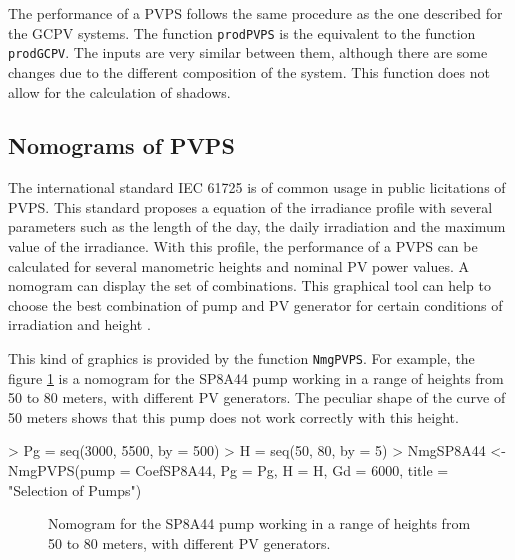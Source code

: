 \documentclass[a4paper]{article}
\renewenvironment{Schunk}{\vspace{\topsep}}{\vspace{\topsep}}
\newcommand{\code}[1]{{\texttt{#1}}}
\begin{document}
The performance of a PVPS follows the same procedure as the one
described for the GCPV systems.  The function \code{prodPVPS} is the
equivalent to the function \code{prodGCPV}.  The inputs are very
similar between them, although there are some changes due to the
different composition of the system. This function does not allow for
the calculation of shadows.

\subsection{Nomograms of PVPS}

The international standard IEC 61725 is of common usage in public
licitations of PVPS.  This standard proposes a equation of the
irradiance profile with several parameters such as the length of the
day, the daily irradiation and the maximum value of the irradiance.
With this profile, the performance of a PVPS can be calculated for
several manometric heights and nominal PV power values. A nomogram can
display the set of combinations.  This graphical tool can help to
choose the best combination of pump and PV generator for certain
conditions of irradiation and height \cite{Abella.Lorenzo.ea2003}.

This kind of graphics is provided by the function
\code{NmgPVPS}. For example, the figure \ref{fig:Nomograma} is a
nomogram for the SP8A44 pump working in a range of heights from 50 to
80 meters, with different PV generators. The peculiar shape of the
curve of 50 meters shows that this pump does not work correctly with
this height.

\begin{Schunk}
\begin{Sinput}
> Pg = seq(3000, 5500, by = 500)
> H = seq(50, 80, by = 5)
> NmgSP8A44 <- NmgPVPS(pump = CoefSP8A44, Pg = Pg, H = H, Gd = 6000, 
     title = "Selection of Pumps")
\end{Sinput}
\end{Schunk}

\begin{figure}
\begin{centering}
\par\end{centering}

\caption{Nomogram for the SP8A44 pump working in a range of heights
  from 50 to 80 meters, with different PV
  generators.\label{fig:Nomograma}}

\end{figure}
\end{document}
